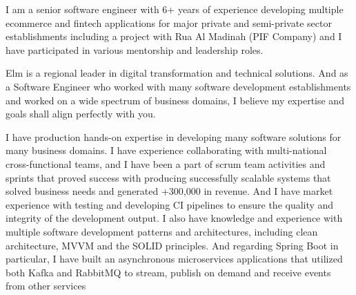 \documentclass[11pt, a4paper]{awesome-cv}
\begin{document}
\makecvheader[L]


\makelettertitle

\begin{cvletter}

I am a senior software engineer with 6+ years of experience developing multiple ecommerce and fintech applications for major private and semi-private sector establishments including a project with Rua Al Madinah (PIF Company) and I have participated in various mentorship and leadership roles.

Elm is a regional leader in digital transformation and technical solutions. And as a Software Engineer who worked with many software development establishments and worked on a wide spectrum of business domains, I believe my expertise and goals shall align perfectly with you.

I have production hands-on expertise in developing many software solutions for many business domains. I have experience collaborating with multi-national cross-functional teams, and I have been a part of scrum team activities and sprints that proved success with producing successfully scalable systems that solved business needs and generated +300,000 in revenue. And I have market experience with testing and developing CI pipelines to ensure the quality and integrity of the development output. I also have knowledge and experience with multiple software development patterns and architectures, including clean architecture, MVVM and the SOLID principles. And regarding Spring Boot in particular, I have built an asynchronous microservices applications that utilized both Kafka and RabbitMQ to stream, publish on demand and receive events from other services

\end{cvletter}


\makeletterclosing
\end{document}
